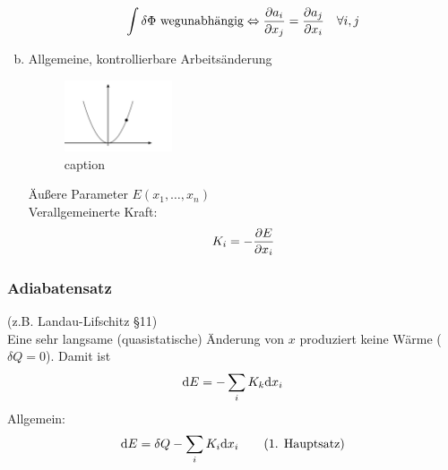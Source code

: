 \begin{enumerate}[a)]
\begin{equation}
        \int \delta \Phi \text{ wegunabhängig} \Leftrightarrow \frac{\partial a_i}{\partial x_j} = \frac{\partial a_j}{\partial x_i} \quad \forall i, j
    \end{equation}
    \item Allgemeine, kontrollierbare Arbeitsänderung
    \begin{figure}[H]
        \begin{center}
            \includegraphics[width=0.3\textwidth]{../img/controlledDeltaWork.pdf}
            \caption{caption}  %
            \label{img:controlledDeltaWork}
        \end{center}
    \end{figure}
    Äußere Parameter $E(x_1, \ldots, x_n)$ \\
    Verallgemeinerte Kraft:
    \begin{equation}
        K_i = - \frac{\partial E}{\partial x_i}
    \end{equation}
\end{enumerate}
\subsubsection{Adiabatensatz}
(z.B. Landau-Lifschitz §11) \\
Eine sehr langsame (quasistatische) Änderung von $x$ produziert keine Wärme ($\delta Q = 0$). Damit ist
\begin{equation}
    \mathrm{d} E = - \sum_i K_k \mathrm{d} x_i
\end{equation}
Allgemein:
\begin{equation}
    \mathrm{d} E = \delta Q - \sum_i K_i \mathrm{d} x_i \qquad \text{(1. Hauptsatz)}
\end{equation}

